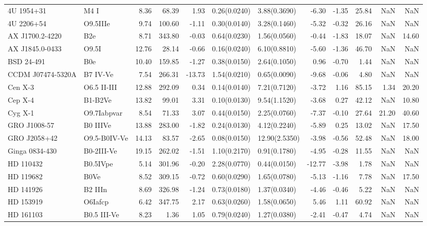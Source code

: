 \begin{longtable}{llrrrllrrrrr}
4U 1954+31 & M4 I & 8.36 & 68.39 & 1.93 & 0.26(0.0240) & 3.88(0.3690) & -6.30 & -1.35 & 25.84 & NaN & NaN \\
4U 2206+54 & O9.5IIIe & 9.74 & 100.60 & -1.11 & 0.30(0.0140) & 3.28(0.1460) & -5.32 & -0.32 & 26.16 & NaN & NaN \\
AX J1700.2-4220 & B2e & 8.71 & 343.80 & -0.03 & 0.64(0.0230) & 1.56(0.0560) & -0.44 & -1.83 & 18.07 & NaN & 14.60 \\
AX J1845.0-0433 & O9.5I & 12.76 & 28.14 & -0.66 & 0.16(0.0240) & 6.10(0.8810) & -5.60 & -1.36 & 46.70 & NaN & NaN \\
BSD 24-491 & B0e & 10.40 & 159.85 & -1.27 & 0.38(0.0150) & 2.64(0.1050) & 0.96 & -0.70 & 1.44 & NaN & NaN \\
CCDM J07474-5320A & B7 IV-Ve & 7.54 & 266.31 & -13.73 & 1.54(0.0210) & 0.65(0.0090) & -9.68 & -0.06 & 4.80 & NaN & NaN \\
Cen X-3 & O6.5 II-III & 12.88 & 292.09 & 0.34 & 0.14(0.0140) & 7.21(0.7120) & -3.72 & 1.16 & 85.15 & 1.34 & 20.20 \\
Cep X-4 & B1-B2Ve & 13.82 & 99.01 & 3.31 & 0.10(0.0130) & 9.54(1.1520) & -3.68 & 0.27 & 42.12 & NaN & 10.80 \\
Cyg X-1 & O9.7Iabpvar & 8.54 & 71.33 & 3.07 & 0.44(0.0150) & 2.25(0.0760) & -7.37 & -0.10 & 27.64 & 21.20 & 40.60 \\
GRO J1008-57 & B0 IIIVe & 13.88 & 283.00 & -1.82 & 0.24(0.0130) & 4.12(0.2240) & -5.89 & 0.25 & 13.02 & NaN & 17.50 \\
GRO J2058+42 & O9.5-B0IV-Ve & 14.13 & 83.57 & -2.65 & 0.08(0.0150) & 12.90(2.5350) & -3.98 & -0.56 & 52.48 & NaN & 18.00 \\
Ginga 0834-430 & B0-2III-Ve & 19.15 & 262.02 & -1.51 & 1.10(0.2170) & 0.91(0.1780) & -4.95 & -0.28 & 11.55 & NaN & NaN \\
HD 110432 & B0.5IVpe & 5.14 & 301.96 & -0.20 & 2.28(0.0770) & 0.44(0.0150) & -12.77 & -3.98 & 1.78 & NaN & NaN \\
HD 119682 & B0Ve & 8.52 & 309.15 & -0.72 & 0.60(0.0290) & 1.65(0.0780) & -5.13 & -1.16 & 7.78 & NaN & 17.50 \\
HD 141926 & B2 IIIn & 8.69 & 326.98 & -1.24 & 0.73(0.0180) & 1.37(0.0340) & -4.46 & -0.46 & 5.22 & NaN & NaN \\
HD 153919 & O6Iafcp & 6.42 & 347.75 & 2.17 & 0.63(0.0260) & 1.58(0.0650) & 5.46 & 1.11 & 60.92 & NaN & NaN \\
HD 161103 & B0.5 III-Ve & 8.23 & 1.36 & 1.05 & 0.79(0.0240) & 1.27(0.0380) & -2.41 & -0.47 & 4.74 & NaN & NaN \\

\end{longtable}
